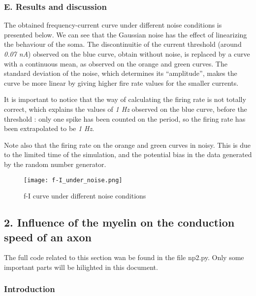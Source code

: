 \documentclass[]{article}
\begin{document}
\hypertarget{e.-results-and-discussion}{%
\subsubsection{E. Results and
discussion}\label{e.-results-and-discussion}}

The obtained frequency-current curve under different noise conditions is
presented below. We can see that the Gaussian noise has the effect of
linearizing the behaviour of the soma. The discontinuitie of the current
threshold (around \emph{0.07 nA}) observed on the blue curve, obtain
without noise, is replaced by a curve with a continuous mean, as
observed on the orange and green curves. The standard deviation of the
noise, which determines its ``amplitude'', makes the curve be more
linear by giving higher fire rate values for the smaller currents.

It is important to notice that the way of calculating the firing rate is
not totally correct, which explains the values of \emph{1 Hz} observed
on the blue curve, before the threshold : only one spike has been
counted on the period, so the firing rate has been extrapolated to be
\emph{1 Hz}.

Note also that the firing rate on the orange and green curves in noisy.
This is due to the limited time of the simulation, and the potential
bias in the data generated by the random number generator.

\begin{figure}
\centering
\texttt{[image: f-I\_under\_noise.png]}
\caption{f-I curve under different noise conditions}
\end{figure}

\newpage

\hypertarget{influence-of-the-myelin-on-the-conduction-speed-of-an-axon}{%
\subsection{2. Influence of the myelin on the conduction speed of an
axon}\label{influence-of-the-myelin-on-the-conduction-speed-of-an-axon}}

The full code related to this section wan be found in the file np2.py.
Only some important parts will be hilighted in this document.

\hypertarget{introduction-1}{%
\subsubsection{Introduction}\label{introduction-1}}
\end{document}

